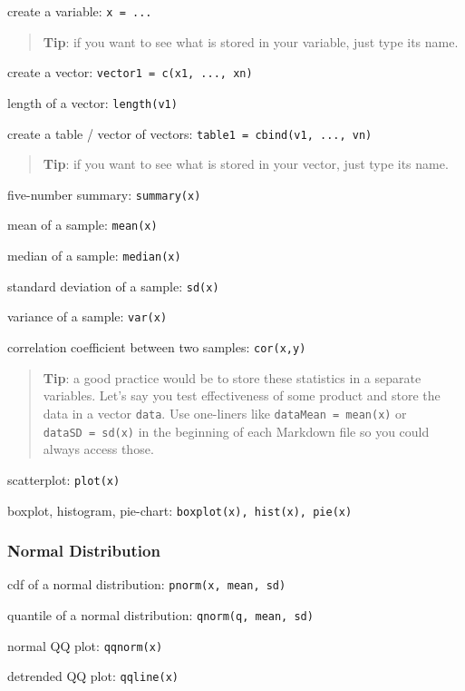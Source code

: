 create a variable: \texttt{x\ =\ ...}

\begin{quote}
\textbf{Tip}: if you want to see what is stored in your variable, just
type its name.
\end{quote}

create a vector: \texttt{vector1\ =\ c(x1,\ ...,\ xn)}

length of a vector: \texttt{length(v1)}

create a table / vector of vectors:
\texttt{table1\ =\ cbind(v1,\ ...,\ vn)}

\begin{quote}
\textbf{Tip}: if you want to see what is stored in your vector, just
type its name.
\end{quote}

five-number summary: \texttt{summary(x)}

mean of a sample: \texttt{mean(x)}

median of a sample: \texttt{median(x)}

standard deviation of a sample: \texttt{sd(x)}

variance of a sample: \texttt{var(x)}

correlation coefficient between two samples: \texttt{cor(x,y)}

\begin{quote}
\textbf{Tip}: a good practice would be to store these statistics in a
separate variables. Let's say you test effectiveness of some product and
store the data in a vector \texttt{data}. Use one-liners like
\texttt{dataMean\ =\ mean(x)} or \texttt{dataSD\ =\ sd(x)} in the
beginning of each Markdown file so you could always access those.
\end{quote}

scatterplot: \texttt{plot(x)}

boxplot, histogram, pie-chart: \texttt{boxplot(x),\ hist(x),\ pie(x)}

\hypertarget{normal-distribution}{%
\subsubsection{Normal Distribution}\label{normal-distribution}}

cdf of a normal distribution: \texttt{pnorm(x,\ mean,\ sd)}

quantile of a normal distribution: \texttt{qnorm(q,\ mean,\ sd)}

normal QQ plot: \texttt{qqnorm(x)}

detrended QQ plot: \texttt{qqline(x)}

